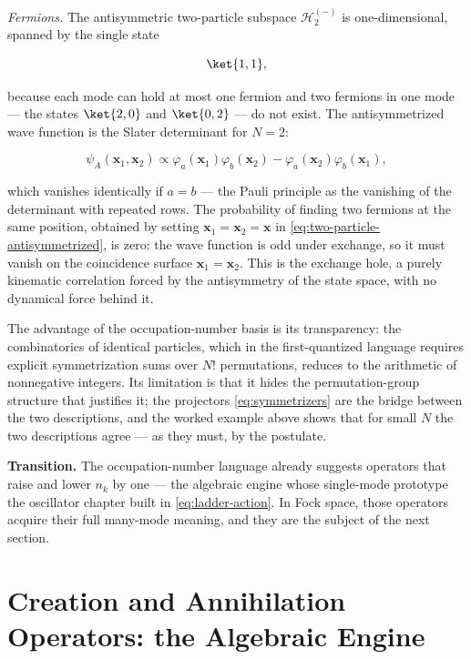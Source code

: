 \textit{Fermions.} The antisymmetric two-particle subspace $\mathcal{H}_2^{(-)}$ is one-dimensional, spanned by the single state
\begin{linenomath}
    \begin{equation*}
        \ket{1,1},
    \end{equation*}
\end{linenomath}
because each mode can hold at most one fermion and two fermions in one mode --- the states $\ket{2,0}$ and $\ket{0,2}$ --- do not exist. The antisymmetrized wave function is the Slater determinant for $N=2$:
\begin{linenomath}
    \begin{equation}
        \psi_A(\bm x_1, \bm x_2)
        \propto \varphi_a(\bm x_1)\varphi_b(\bm x_2)
                - \varphi_a(\bm x_2)\varphi_b(\bm x_1),
        \label{eq:two-particle-antisymmetrized}
    \end{equation}
\end{linenomath}
which vanishes identically if $a=b$ --- the Pauli principle as the vanishing of the determinant with repeated rows. The probability of finding two fermions at the same position, obtained by setting $\bm x_1 = \bm x_2 = \bm x$ in \eqref{eq:two-particle-antisymmetrized}, is zero: the wave function is odd under exchange, so it must vanish on the coincidence surface $\bm x_1 = \bm x_2$. This is the exchange hole, a purely kinematic correlation forced by the antisymmetry of the state space, with no dynamical force behind it.

The advantage of the occupation-number basis is its transparency: the combinatorics of identical particles, which in the first-quantized language requires explicit symmetrization sums over $N!$ permutations, reduces to the arithmetic of nonnegative integers. Its limitation is that it hides the permutation-group structure that justifies it; the projectors \eqref{eq:symmetrizers} are the bridge between the two descriptions, and the worked example above shows that for small $N$ the two descriptions agree --- as they must, by the postulate.

\medskip\noindent\textbf{Transition.}
The occupation-number language already suggests operators that raise and lower $n_k$ by one --- the algebraic engine whose single-mode prototype the oscillator chapter built in \eqref{eq:ladder-action}. In Fock space, those operators acquire their full many-mode meaning, and they are the subject of the next section.

\section{Creation and Annihilation Operators: the Algebraic Engine}
\label{sec:creation-annihilation}

